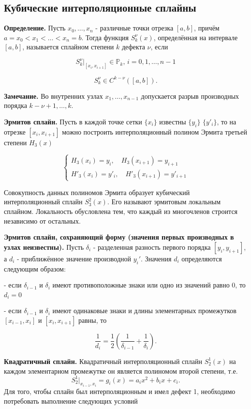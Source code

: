 \subsection{Кубические интерполяционные сплайны}

\textbf{Определение.} Пусть \(x_0, \ldots, x_n\) - различные точки отрезка \([a, b]\), причём  
\(a = x_0 < x_1 < \ldots < x_n = b\). Тогда функция \(S_k^\nu(x)\), определённая на интервале \([a, b]\), называется сплайном степени \(k\) дефекта \(\nu\), если  

$$S_k^\nu|_{[x_i, x_{i+1}]} \in \mathbb{P}_k, \, i = 0, 1, \ldots, n-1$$

$$S_k^\nu \in C^{k-\nu}([a, b]).$$

\textbf{Замечание.} Во внутренних узлах \(x_1, \ldots, x_{n-1}\) допускается разрыв производных порядка \(k - \nu + 1, \ldots, k\).

\textbf{Эрмитов сплайн.} 
Пусть в каждой точке сетки \(\{x_i\}\) известны \(\{y_i\}\) \(\{y'_i\}\), то на отрезке \([x_i, x_{i+1}]\) можно построить интерполяционный полином Эрмита третьей степени \(H_3(x)\)

$$\begin{cases} 
	H_3(x_i) = y_i, \quad H_3(x_{i+1}) = y_{i+1} \\ 
	H'_3(x_i) = y'_i, \quad H'_3(x_{i+1}) = y'_{i+1} 
\end{cases}$$

Совокупность данных полиномов Эрмита образует кубический интерполяционный сплайн \(S^2_3(x)\). Его называют эрмитовым локальным сплайном. Локальность обусловлена тем, что каждый из многочленов строится независимо от остальных.

\textbf{Эрмитов сплайн, сохраняющий форму (значения первых производных в узлах неизвестны).}
Пусть \( \delta_i \) - разделенная разность первого порядка \([y_i, y_{i+1}]\), а \( d_i \) - приближённое значение производной \( y_i' \). Значения \( d_i \) определяются следующим образом:

- если \( \delta_{i-1} \) и \( \delta_i \) имеют противоположные знаки или одно из значений равно 0, то \( d_i = 0 \)

- если \( \delta_{i-1} \) и \( \delta_i \) имеют одинаковые знаки и длины элементарных промежутков \([x_{i-1}, x_i]\) и \([x_i, x_{i+1}]\) равны, то

$$\frac{1}{d_i} = \frac{1}{2} \left( \frac{1}{\delta_{i-1}} + \frac{1}{\delta_i} \right).$$

\textbf{Квадратичный сплайн.}
Квадратичный интерполяционный сплайн \( S_2^1(x) \) на каждом элементарном промежутке он является полиномом второй степени, т.е.  
$$S_2^1|_{x_{i-1}, x_i} = g_i(x) = a_i x^2 + b_i x + c_i.$$
Для того, чтобы сплайн был интерполяционным и имел дефект 1, необходимо потребовать  
выполнение следующих условий  

